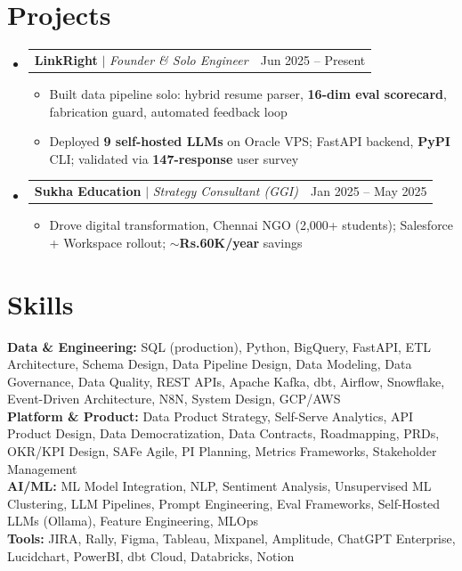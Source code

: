 \documentclass[a4paper,10pt]{article}
\makeatletter
\newcommand{\resumeItem}[1]{
  \item\small{#1\vspace{-2pt}}
}
\newcommand{\resumeProjectHeading}[2]{
  \item
  \begin{tabular*}{0.97\textwidth}{l@{\extracolsep{\fill}}r}
    \small#1 & #2 \\
  \end{tabular*}\vspace{-7pt}
}
\newcommand{\resumeSubHeadingListStart}{\begin{itemize}[leftmargin=0.15in, label={}]}
\newcommand{\resumeSubHeadingListEnd}{\end{itemize}}
\newcommand{\resumeItemListStart}{\begin{itemize}\parfillskip=0pt}
\newcommand{\resumeItemListEnd}{\end{itemize}\vspace{-5pt}}
\makeatother
\begin{document}
\section{Projects}
\resumeSubHeadingListStart

  \resumeProjectHeading
    {\textbf{LinkRight} $|$ \emph{Founder \& Solo Engineer}}{Jun 2025 -- Present}
  \resumeItemListStart
    \resumeItem{Built data pipeline solo: hybrid resume parser, \textbf{16-dim eval scorecard}, fabrication guard, automated feedback loop}
    \resumeItem{Deployed \textbf{9 self-hosted LLMs} on Oracle VPS; FastAPI backend, \textbf{PyPI} CLI; validated via \textbf{147-response} user survey}
  \resumeItemListEnd

  \resumeProjectHeading
    {\textbf{Sukha Education} $|$ \emph{Strategy Consultant (GGI)}}{Jan 2025 -- May 2025}
  \resumeItemListStart
    \resumeItem{Drove digital transformation, Chennai NGO (2,000+ students); Salesforce + Workspace rollout; \textbf{$\sim$Rs.60K/year} savings}
  \resumeItemListEnd

\resumeSubHeadingListEnd

\section{Skills}
\begin{itemize}[leftmargin=0.15in, label={}]
  \small{\item{
    \textbf{Data \& Engineering:}{ SQL (production), Python, BigQuery, FastAPI, ETL Architecture, Schema Design, Data Pipeline Design, Data Modeling, Data Governance, Data Quality, REST APIs, Apache Kafka, dbt, Airflow, Snowflake, Event-Driven Architecture, N8N, System Design, GCP/AWS} \\
    \textbf{Platform \& Product:}{ Data Product Strategy, Self-Serve Analytics, API Product Design, Data Democratization, Data Contracts, Roadmapping, PRDs, OKR/KPI Design, SAFe Agile, PI Planning, Metrics Frameworks, Stakeholder Management} \\
    \textbf{AI/ML:}{ ML Model Integration, NLP, Sentiment Analysis, Unsupervised ML Clustering, LLM Pipelines, Prompt Engineering, Eval Frameworks, Self-Hosted LLMs (Ollama), Feature Engineering, MLOps} \\
    \textbf{Tools:}{ JIRA, Rally, Figma, Tableau, Mixpanel, Amplitude, ChatGPT Enterprise, Lucidchart, PowerBI, dbt Cloud, Databricks, Notion}
  }}
\end{itemize}
\end{document}
